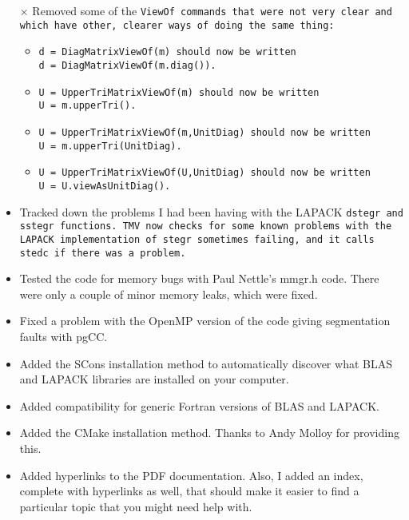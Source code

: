 \begin{description}
\begin{itemize}
\item[$\times$]
Removed some of the \tt{ViewOf} commands that were not very clear and
which have other, clearer ways of doing the same thing:
\begin{itemize}
\item
\tt{d = DiagMatrixViewOf(m)} should now be written\\
\tt{d = DiagMatrixViewOf(m.diag())}.
\item
\tt{U = UpperTriMatrixViewOf(m)} should now be written\\
\tt{U = m.upperTri()}.
\item
\tt{U = UpperTriMatrixViewOf(m,UnitDiag)} should now be written\\
\tt{U = m.upperTri(UnitDiag)}.
\item
\tt{U = UpperTriMatrixViewOf(U,UnitDiag)} should now be written\\
\tt{U = U.viewAsUnitDiag()}.
\end{itemize}

\item
Tracked down the problems I had been having with the LAPACK \tt{dstegr} and \tt{sstegr} 
functions.  TMV now checks for some known problems with the LAPACK implementation
of \tt{stegr} sometimes failing, and it calls \tt{stedc} if there was a problem.

\item
Tested the code for memory bugs with Paul Nettle's mmgr.h code.  There were only a couple of 
minor memory leaks, which were fixed.

\item
Fixed a problem with the OpenMP version of the code giving segmentation faults with pgCC.

\item
Added the SCons installation method to automatically discover what BLAS and LAPACK libraries 
are installed on your computer.  

\item
Added compatibility for generic Fortran versions of BLAS and LAPACK.

\item
Added the CMake installation method.  Thanks to Andy Molloy for providing this.  

\item
Added hyperlinks to the PDF documentation. Also, I added an index, complete with hyperlinks as well, that should make it easier to find a particular topic that you might need help with.

\end{itemize}


\end{description}

